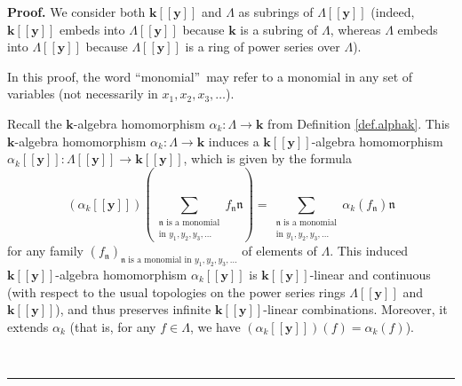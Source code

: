 \documentclass[numbers=enddot,12pt,final,onecolumn,notitlepage]{scrartcl}%
\theoremstyle{definition}
\newenvironment{proof}[1][Proof]{\noindent\textbf{#1.} }{\ \rule{0.5em}{0.5em}}
\let\sumnonlimits\sum
\renewcommand{\sum}{\sumnonlimits\limits}
\begin{document}
\begin{proof}
We consider both $\mathbf{k}\left[  \left[  \mathbf{y}\right]  \right]  $ and
$\Lambda$ as subrings of $\Lambda\left[  \left[  \mathbf{y}\right]  \right]  $
(indeed, $\mathbf{k}\left[  \left[  \mathbf{y}\right]  \right]  $ embeds into
$\Lambda\left[  \left[  \mathbf{y}\right]  \right]  $ because $\mathbf{k}$ is
a subring of $\Lambda$, whereas $\Lambda$ embeds into $\Lambda\left[  \left[
\mathbf{y}\right]  \right]  $ because $\Lambda\left[  \left[  \mathbf{y}%
\right]  \right]  $ is a ring of power series over $\Lambda$).

In this proof, the word \textquotedblleft monomial\textquotedblright\ may
refer to a monomial in any set of variables (not necessarily in $x_{1}%
,x_{2},x_{3},\ldots$).

Recall the $\mathbf{k}$-algebra homomorphism $\alpha_{k}:\Lambda
\rightarrow\mathbf{k}$ from Definition \ref{def.alphak}. This $\mathbf{k}%
$-algebra homomorphism $\alpha_{k}:\Lambda\rightarrow\mathbf{k}$ induces a
$\mathbf{k}\left[  \left[  \mathbf{y}\right]  \right]  $-algebra homomorphism
$\alpha_{k}\left[  \left[  \mathbf{y}\right]  \right]  :\Lambda\left[  \left[
\mathbf{y}\right]  \right]  \rightarrow\mathbf{k}\left[  \left[
\mathbf{y}\right]  \right]  $, which is given by the formula%
\[
\left(  \alpha_{k}\left[  \left[  \mathbf{y}\right]  \right]  \right)  \left(
\sum_{\substack{\mathfrak{n}\text{ is a monomial}\\\text{in }y_{1},y_{2}%
,y_{3},\ldots}}f_{\mathfrak{n}}\mathfrak{n}\right)  =\sum
_{\substack{\mathfrak{n}\text{ is a monomial}\\\text{in }y_{1},y_{2}%
,y_{3},\ldots}}\alpha_{k}\left(  f_{\mathfrak{n}}\right)  \mathfrak{n}%
\]
for any family $\left(  f_{\mathfrak{n}}\right)  _{\mathfrak{n}\text{ is a
monomial in }y_{1},y_{2},y_{3},\ldots}$ of elements of $\Lambda$. This induced
$\mathbf{k}\left[  \left[  \mathbf{y}\right]  \right]  $-algebra homomorphism
$\alpha_{k}\left[  \left[  \mathbf{y}\right]  \right]  $ is $\mathbf{k}\left[
\left[  \mathbf{y}\right]  \right]  $-linear and continuous (with respect to
the usual topologies on the power series rings $\Lambda\left[  \left[
\mathbf{y}\right]  \right]  $ and $\mathbf{k}\left[  \left[  \mathbf{y}%
\right]  \right]  $), and thus preserves infinite $\mathbf{k}\left[  \left[
\mathbf{y}\right]  \right]  $-linear combinations. Moreover, it extends
$\alpha_{k}$ (that is, for any $f\in\Lambda$, we have $\left(  \alpha
_{k}\left[  \left[  \mathbf{y}\right]  \right]  \right)  \left(  f\right)
=\alpha_{k}\left(  f\right)  $).


\end{proof}
\end{document}
